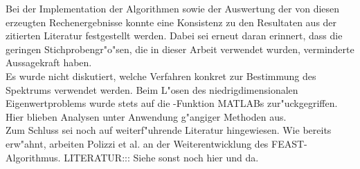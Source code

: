 \newpage

Bei der Implementation der Algorithmen sowie der Auswertung der von diesen erzeugten Rechenergebnisse konnte eine Konsistenz zu den Resultaten aus der zitierten Literatur festgestellt werden. Dabei sei erneut daran erinnert, dass die geringen Stichprobengr"o"sen, die in dieser Arbeit verwendet wurden, verminderte Aussagekraft haben.\\

Es wurde nicht diskutiert, welche Verfahren konkret zur Bestimmung des Spektrums verwendet werden. Beim L"osen des niedrigdimensionalen Eigenwertproblems wurde stets auf die -Funktion MATLABs zur"uckgegriffen. Hier blieben Analysen unter Anwendung g"angiger Methoden aus.\\

Zum Schluss sei noch auf weiterf"uhrende Literatur hingewiesen. Wie bereits erw"ahnt, arbeiten Polizzi et al. an der Weiterentwicklung des FEAST-Algorithmus. LITERATUR::: Siehe sonst noch hier und da.
